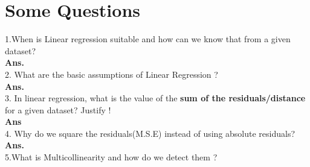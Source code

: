 \documentclass[a4paper, 11pt]{article}
\begin{document}
\section{Some Questions}
1.When is Linear regression suitable and how can we know that from a given dataset?\\
\textbf{Ans.} \\
2. What are the basic assumptions of Linear Regression ? \\
\textbf{Ans.}\\
3. In linear regression, what is the value of the \textbf{sum of the residuals/distance} for a given dataset? Justify ! \\
\textbf{Ans} \\
4. Why do we square the residuals(M.S.E) instead of using absolute residuals? \\
\textbf{Ans.} \\
5.What is Multicollinearity and how do we detect them ? 
\end{document}
